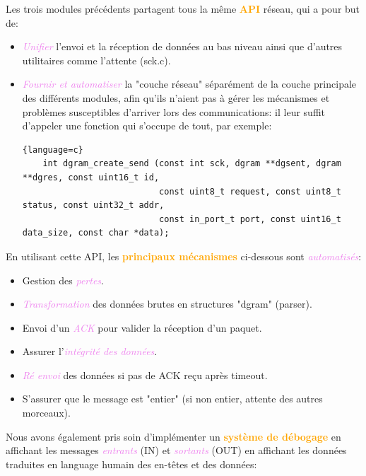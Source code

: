 \documentclass[a4paper]{article}
\let\oldtextbf\textbf
\renewcommand{\textbf}[1]{\textcolor{orange}{\oldtextbf{#1}}}
\let\oldtextit\textit
\renewcommand{\textit}[1]{\textcolor{violet}{\oldtextit{#1}}}
\begin{document}
Les trois modules précédents partagent tous la même \textbf{API} réseau, qui a pour but de:
\begin{itemize}
    \item \textit{Unifier} l'envoi et la réception de données au bas niveau ainsi que d'autres utilitaires comme l'attente (sck.c).
    \item \textit{Fournir et automatiser} la "couche réseau" séparément de la couche principale des différents modules, afin qu'ils n'aient pas à gérer les mécanismes et problèmes susceptibles d'arriver lors des communications: il leur suffit d'appeler une fonction qui s'occupe de tout, par exemple:
    \begin{lstlisting}{language=c}
    int dgram_create_send (const int sck, dgram **dgsent, dgram **dgres, const uint16_t id,
                           const uint8_t request, const uint8_t status, const uint32_t addr,
                           const in_port_t port, const uint16_t data_size, const char *data);
    \end{lstlisting}
\end{itemize}

En utilisant cette API, les \textbf{principaux mécanismes} ci-dessous sont \textit{automatisés}:
\begin{itemize}
    \item Gestion des \textit{pertes}.
    \item \textit{Transformation} des données brutes en structures "dgram" (parser).
    \item Envoi d'un \textit{ACK} pour valider la réception d'un paquet.
    \item Assurer l'\textit{intégrité des données}.
    \item \textit{Ré envoi} des données si pas de ACK reçu après timeout.
    \item S'assurer que le message est "entier" (si non entier, attente des autres morceaux).
\end{itemize}

\newpage
Nous avons également pris soin d'implémenter un \textbf{système de débogage} en affichant les messages \textit{entrants} (IN) et \textit{sortants} (OUT) en affichant les données traduites en language humain des en-têtes et des données:
\end{document}
